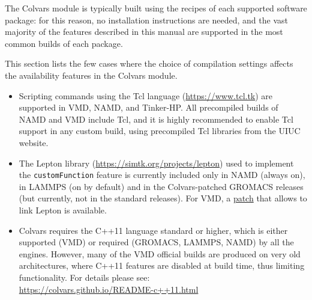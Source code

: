
The Colvars module is typically built using the recipes of each supported software package: for this reason, no installation instructions are needed, and the vast majority of the features described in this manual are supported in the most common builds of each package.

This section lists the few cases where the choice of compilation settings affects the availability features in the Colvars module.

\begin{itemize}

\item Scripting commands using the Tcl language (\url{https://www.tcl.tk}) are supported in VMD, NAMD, and Tinker-HP.  All precompiled builds of NAMD and VMD include Tcl, and it is highly recommended to enable Tcl support in any custom build, using precompiled Tcl libraries from the UIUC website.

\item The Lepton library (\url{https://simtk.org/projects/lepton}) used to implement the \texttt{customFunction} feature is currently included only in NAMD (always on), in LAMMPS (on by default) and in the Colvars-patched GROMACS releases (but currently, not in the standard releases).  For VMD, a \href{https://github.com/giacomofiorin/vmd-patches}{patch} that allows to link Lepton is available.

\item Colvars requires the C++11 language standard or higher, which is either supported (VMD) or required (GROMACS, LAMMPS, NAMD) by all the engines.  However, many of the VMD official builds are produced on very old architectures, where C++11 features are disabled at build time, thus limiting functionality.  For details please see:\\
  \url{https://colvars.github.io/README-c++11.html}
\end{itemize}

